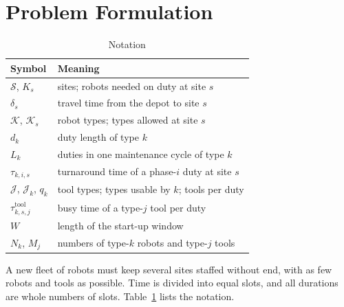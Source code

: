 \section{Problem Formulation}
\label{sec:problem}


\begin{table}[t]
  \centering
  \caption{Notation}
  \label{tab:notation}
  \footnotesize
  \begin{tabular}{@{}ll@{}}
    \toprule
    Symbol & Meaning \\
    \midrule
    $\mathcal{S}$, $K_s$ & sites; robots needed on duty at site $s$ \\
    $\delta_s$ & travel time from the depot to site $s$ \\
    $\mathcal{K}$, $\mathcal{K}_s$ & robot types; types allowed at site $s$ \\
    $d_k$ & duty length of type $k$ \\
    $L_k$ & duties in one maintenance cycle of type $k$ \\
    $\tau_{k,i,s}$ & turnaround time of a phase-$i$ duty at site $s$ \\
    $\mathcal{J}$, $\mathcal{J}_k$, $q_k$ & tool types; types usable by $k$; tools per duty \\
    $\tau^{\mathrm{tool}}_{k,s,j}$ & busy time of a type-$j$ tool per duty \\
    $W$ & length of the start-up window \\
    $N_k$, $M_j$ & numbers of type-$k$ robots and type-$j$ tools \\
    \bottomrule
  \end{tabular}
\end{table}

A new fleet of robots must keep several sites staffed without end, with as few robots and tools as possible.
Time is divided into equal slots, and all durations are whole numbers of slots.
Table~\ref{tab:notation} lists the notation.

